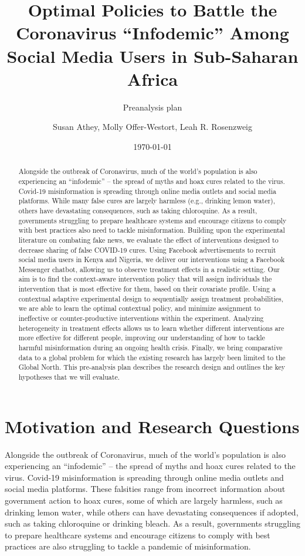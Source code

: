 \documentclass[letterpaper, 12pt, parskip=full, headsepline]{scrartcl}
\title{Optimal Policies to Battle the Coronavirus ``Infodemic'' Among Social Media Users in Sub-Saharan Africa}
\subtitle{Preanalysis plan}
\author{Susan Athey, Molly Offer-Westort, Leah R. Rosenzweig}
\date{\today}
\begin{document}
%
\normalsize%
\maketitle%
\tableofcontents%
\clearpage%


\begin{abstract}
Alongside the outbreak of Coronavirus, much of the world’s population is also experiencing an “infodemic” -- the spread of myths and hoax cures related to the virus. Covid-19 misinformation is spreading through online media outlets and social media platforms. While many false cures are largely harmless (e.g., drinking lemon water), others have devastating consequences, such as taking chloroquine. As a result, governments struggling to prepare healthcare systems and encourage citizens to comply with best practices also need to tackle misinformation. Building upon the experimental literature on combating fake news, we evaluate the effect of interventions designed to decrease sharing of false COVID-19 cures. Using Facebook advertisements to recruit social media users in Kenya and Nigeria, we deliver our interventions using a Facebook Messenger chatbot, allowing us to observe treatment effects in a realistic setting. Our aim is to find the context-aware intervention policy that will assign individuals the intervention that is most effective for them, based on their covariate profile. Using a contextual adaptive experimental design to sequentially assign treatment probabilities, we are able to learn the optimal contextual policy, and minimize assignment to ineffective or counter-productive interventions within the experiment. Analyzing heterogeneity in treatment effects allows us to learn whether different interventions are more effective for different people, improving our understanding of how to tackle harmful misinformation during an ongoing health crisis. Finally, we bring comparative data to a global problem for which the existing research has largely been limited to the Global North. This pre-analysis plan describes the research design and outlines the key hypotheses that we will evaluate.
\end{abstract}





\section{Motivation and Research Questions}

Alongside the outbreak of Coronavirus, much of the world's population is also experiencing an ``infodemic'' -- the spread of myths and hoax cures related to the virus. Covid-19 misinformation is spreading through online media outlets and social media platforms. These falsities range from incorrect information about government action to hoax cures, some of which are largely harmless, such as drinking lemon water, while others can have devastating consequences if adopted, such as taking chloroquine or drinking bleach. As a result, governments struggling to prepare healthcare systems and encourage citizens to comply with best practices are also struggling to tackle a pandemic of misinformation.
\end{document}
